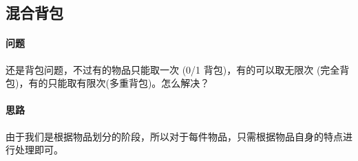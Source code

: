 \subsection{混合背包}
	\paragraph{问题} 还是背包问题，不过有的物品只能取一次 (0/1 背包)，有的可以取无限次 (完全背包)，有的只能取有限次(多重背包)。怎么解决？
	
	\paragraph{思路} 由于我们是根据物品划分的阶段，所以对于每件物品，只需根据物品自身的特点进行处理即可。
	
